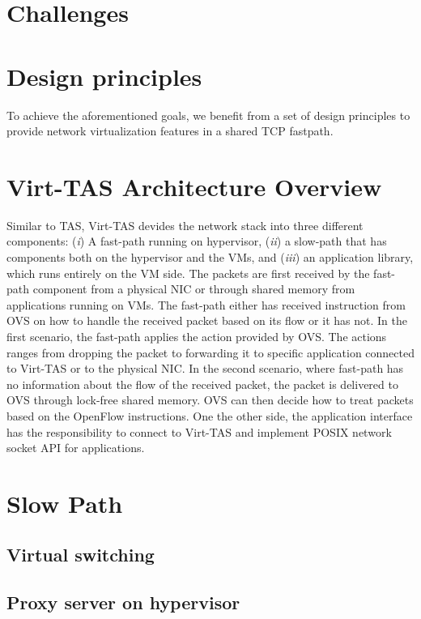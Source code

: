 \section{Challenges}

\section{Design principles}
To achieve the aforementioned goals, we benefit from a set of design principles 
to provide network virtualization features in a shared TCP fastpath.

\section{Virt-TAS Architecture Overview}

Similar to TAS, Virt-TAS devides the network stack into three different components:
(\emph{i}) A fast-path running on hypervisor, (\emph{ii}) a slow-path that has components
both on the hypervisor and the VMs, and (\emph{iii}) an application library, which 
runs entirely on the VM side. The packets are first received by the fast-path component 
from a physical NIC or through shared memory from applications running on VMs. The fast-path 
either has received instruction from OVS on how to handle the received packet based on its flow or 
it has not. In the first scenario, the fast-path applies the action provided by OVS.
The actions ranges from dropping the packet to forwarding it to specific application connected
to Virt-TAS or to the physical NIC. In the second 
scenario, where fast-path has no information about the flow of the received packet,  the packet is
delivered to OVS through lock-free shared memory. OVS can then decide how to treat 
packets based on the OpenFlow instructions. One the other side, the application interface has the 
responsibility to connect to Virt-TAS and implement POSIX network socket API for applications.


\section{Slow Path}
\subsection{Virtual switching}
\subsection{Proxy server on hypervisor}
